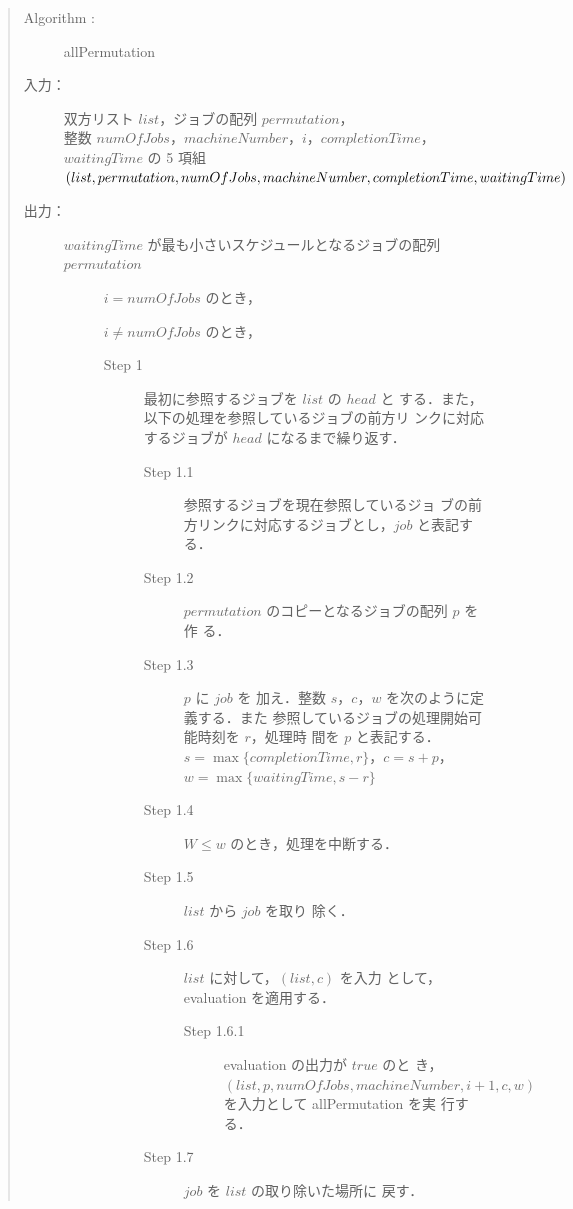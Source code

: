 \documentclass[12pt]{optlab-bachelor}
\begin{document}
\begin{quote}
  \begin{description}
    \item[{\sc Algorithm : }] {\sc allPermutation}
    \item[入力：]  双方リスト $list$，ジョブの配列 $permutation$，\\整数 $numOfJobs$，$machineNumber$，$i$，$completionTime$，$waitingTime$ の 5 項組 $(list,permutation,numOfJobs,machineNumber,\\completionTime,waitingTime)$
    \item[出力：] $waitingTime$ が最も小さいスケジュールとなるジョブの配列\\ $permutation$
    \begin{description}
      \item[] $i = numOfJobs$ のとき，
      \item[] $i \neq numOfJobs$ のとき，
      \begin{description}
        \item[Step 1 ] 最初に参照するジョブを $list$ の $head$ と
        する．また，以下の処理を参照しているジョブの前方リ
        ンクに対応するジョブが $head$ になるまで繰り返す．
        \begin{description}
          \item[Step 1.1] 参照するジョブを現在参照しているジョ
          ブの前方リンクに対応するジョブとし，$job$ と表記す
          る．
          \item[Step 1.2 ] $permutation$ のコピーとなるジョブの配列 $p$ を作
          る．
          \item[Step 1.3 ] $p$ に $job$ を
          加え．整数 $s$，$c$，$w$ を次のように定義する．また
          参照しているジョブの処理開始可能時刻を $r$，処理時
          間を $p$ と表記する．
          $s = \max\{completionTime, r\}$，$c = s + p$，$w =
          \max\{waitingTime,s - r\}$
          \item[Step 1.4 ] $W \le w$ のとき，処理を中断する．
          \item[Step 1.5 ] $list$ から $job$ を取り
          除く．
          \item[Step 1.6 ] $list$ に対して，$(list,c)$ を入力
          として，{\sc evaluation} を適用する．
          \begin{description}
            \item[Step 1.6.1 ] {\sc evaluation} の出力が $true$ のと
            き，\\$(list,p,numOfJobs,machineNumber,i +
            1,c,w)$ を入力として {\sc allPermutation} を実
            行する．
          \end{description}
          \item[Step 1.7 ] $job$ を $list$ の取り除いた場所に
          戻す．
        \end{description}
      \end{description}
    \end{description}
  \end{description}
\end{quote}
\end{document}
